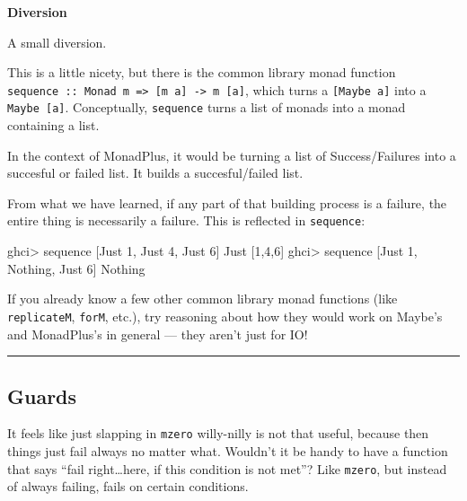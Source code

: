 \documentclass[]{article}
\newenvironment{Shaded}{}{}
\newcommand{\DataTypeTok}[1]{\textcolor[rgb]{0.56,0.13,0.00}{#1}}
\newcommand{\DecValTok}[1]{\textcolor[rgb]{0.25,0.63,0.44}{#1}}
\newcommand{\FunctionTok}[1]{\textcolor[rgb]{0.02,0.16,0.49}{#1}}
\newcommand{\NormalTok}[1]{#1}
\begin{document}
\textbf{Diversion}

A small diversion.

This is a little nicety, but there is the common library monad function
\texttt{sequence\ ::\ Monad\ m\ =\textgreater{}\ {[}m\ a{]}\ -\textgreater{}\ m\ {[}a{]}},
which turns a \texttt{{[}Maybe\ a{]}} into a \texttt{Maybe\ {[}a{]}}.
Conceptually, \texttt{sequence} turns a list of monads into a monad containing a
list.

In the context of MonadPlus, it would be turning a list of Success/Failures into
a succesful or failed list. It builds a succesful/failed list.

From what we have learned, if any part of that building process is a failure,
the entire thing is necessarily a failure. This is reflected in
\texttt{sequence}:

\begin{Shaded}
\begin{Highlighting}[]
\NormalTok{ghci}\FunctionTok{>}\NormalTok{ sequence [}\DataTypeTok{Just} \DecValTok{1}\NormalTok{, }\DataTypeTok{Just} \DecValTok{4}\NormalTok{, }\DataTypeTok{Just} \DecValTok{6}\NormalTok{]}
\DataTypeTok{Just}\NormalTok{ [}\DecValTok{1}\NormalTok{,}\DecValTok{4}\NormalTok{,}\DecValTok{6}\NormalTok{]}
\NormalTok{ghci}\FunctionTok{>}\NormalTok{ sequence [}\DataTypeTok{Just} \DecValTok{1}\NormalTok{, }\DataTypeTok{Nothing}\NormalTok{, }\DataTypeTok{Just} \DecValTok{6}\NormalTok{]}
\DataTypeTok{Nothing}
\end{Highlighting}
\end{Shaded}

If you already know a few other common library monad functions (like
\texttt{replicateM}, \texttt{forM}, etc.), try reasoning about how they would
work on Maybe's and MonadPlus's in general --- they aren't just for IO!

\begin{center}\rule{0.5\linewidth}{\linethickness}\end{center}

\hypertarget{guards}{%
\subsection{Guards}\label{guards}}

It feels like just slapping in \texttt{mzero} willy-nilly is not that useful,
because then things just fail always no matter what. Wouldn't it be handy to
have a function that says ``fail right\ldots{}here, if this condition is not
met''? Like \texttt{mzero}, but instead of always failing, fails on certain
conditions.
\end{document}
